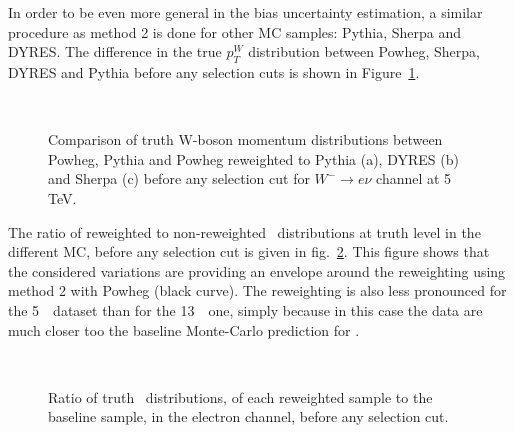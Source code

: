 In order to be even more general in the bias uncertainty estimation, a similar procedure as method 2 is done for other MC samples: Pythia, Sherpa and DYRES. The difference in the true $p_{T}^W$ distribution between Powheg, Sherpa, DYRES and Pythia before any selection cuts is shown in Figure~\ref{fig:truthrewMC}.\\

\begin{figure}[h]
  \centering
   \\
  \caption{Comparison of truth W-boson momentum distributions between Powheg, Pythia and Powheg reweighted to Pythia (a), DYRES (b) and Sherpa (c) before any selection cut for $W^{-}\rightarrow e\nu$ channel at 5 TeV.}
  \label{fig:truthrewMC}
\end{figure}

The ratio of reweighted to non-reweighted \ptw\ distributions at truth level in the different MC, before any selection cut is given in fig.~\ref{fig:BiasrewOvernonRewTruth}.
This figure shows that the considered variations are providing an envelope around the reweighting using method 2 with Powheg (black curve). The reweighting is also less pronounced for the 5~\TeV\ dataset than for the 13~\TeV\ one, simply because in this case the data are much closer too the baseline Monte-Carlo prediction for \ut.

\begin{figure}[h]
  \centering
   \\
  \caption{Ratio of truth \ptw\ distributions, of each reweighted sample to the baseline sample, in the electron channel, before any selection cut.}
  \label{fig:BiasrewOvernonRewTruth}
\end{figure}

